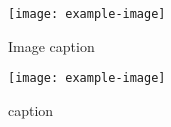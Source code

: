 \documentclass[a4paper, english, final]{article}
\begin{document}
\begin{figure}[H]
    \centering
    \texttt{[image: example-image]}
    \caption{Image caption}
    \label{fig:id}
\end{figure}

{
\begin{landscape}
    \begin{figure}
        \texttt{[image: example-image]}
        \caption{caption}
        \label{fig:id2}
    \end{figure}
\end{landscape}
\restoregeometry
\clearpage
}

{
\newpage
\nocite{*} %
\printbibliography[heading=bibnumbered,title={Bibliography}]
}
\end{document}
